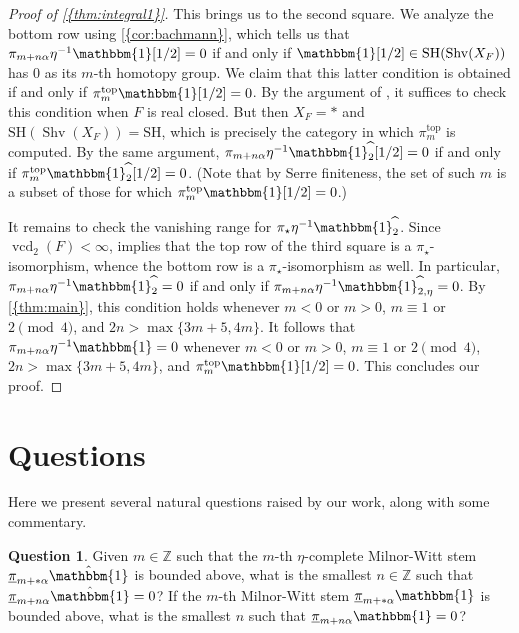 \documentclass[10pt]{amsart}
\numberwithin{equation}{section}
\theoremstyle{plain}
\theoremstyle{definition}
\newtheorem{question}[question]{Question}
\theoremstyle{remark}
\begin{document}
\begin{proof}[Proof of {\autoref{{thm:integral1}}}]
This brings us to the second square.  We analyze the bottom row using {\autoref{{cor:bachmann}}}, which tells us that $\pi_{m+n\alpha}\eta^{-1}{\mathbbm{1}}[1/2] = 0$ if and only if ${\mathbbm{1}}[1/2]\in {\mathrm{SH}}({\operatorname{Shv}}(X_F))$ has $0$ as its $m$-th homotopy group.  We claim that this latter condition is obtained if and only if $\pi_m^{{\mathrm{top}}}{\mathbbm{1}}[1/2] = 0$.  By the argument of \cite[Proposition 40]{bachmann:rho}, it suffices to check this condition when $F$ is real closed.  But then $X_F = *$ and ${\mathrm{SH}}({\operatorname{Shv}}(X_F)) = {\mathrm{SH}}$, which is precisely the category in which $\pi_m^{{\mathrm{top}}}$ is computed.  By the same argument, $\pi_{m+n\alpha}\eta^{-1}{\mathbbm{1}}{^{\widehat{~}}_{{2}}}[1/2] = 0$ if and only if $\pi_m^{{\mathrm{top}}}{\mathbbm{1}}{^{\widehat{~}}_{{2}}}[1/2] = 0$.  (Note that by Serre finiteness, the set of such $m$ is a subset of those for which $\pi_m^{{\mathrm{top}}}{\mathbbm{1}}[1/2] = 0$.)

It remains to check the vanishing range for $\pi_\star \eta^{-1}{\mathbbm{1}}{^{\widehat{~}}_{{2}}}$.  Since ${\operatorname{vcd}}_2(F)<\infty$, \cite[Theorem 1]{MASSConv} implies that the top row of the third square is a $\pi_\star$-isomorphism, whence the bottom row is a $\pi_\star$-isomorphism as well.  In particular, $\pi_{m+n\alpha}\eta^{-1}{\mathbbm{1}}{^{\widehat{~}}_{{2}}} = 0$ if and only if $\pi_{m+n\alpha}\eta^{-1}{\mathbbm{1}}{^{\widehat{~}}_{{2,\eta}}} = 0$.  By {\autoref{{thm:main}}}, this condition holds whenever $m<0$ or $m>0$, $m\equiv1$ or $2\pmod 4$, and $2n>\max\{3m+5,4m\}$.  It follows that $\pi_{m+n\alpha}\eta^{-1}{\mathbbm{1}} = 0$ whenever $m<0$ or $m>0$, $m\equiv1$ or $2\pmod 4$,  $2n>\max\{3m+5,4m\}$, and $\pi_m^{{\mathrm{top}}} {\mathbbm{1}}[1/2] =0$.  This concludes our proof.
\end{proof}

\section{Questions}\label{sec:q}
Here we present several natural questions raised by our work, along with some commentary.

\begin{question}
Given $m\in {\mathbb{Z}}$ such that the $m$-th $\eta$-complete Milnor-Witt stem ${\underline{\smash{\pi}}}_{m+*\alpha}\hat{\mathbbm{1}}$ is bounded above, what is the smallest $n\in {\mathbb{Z}}$ such that ${\underline{\smash{\pi}}}_{m+n\alpha}\hat{\mathbbm{1}} =0$?  If the $m$-th Milnor-Witt stem ${\underline{\smash{\pi}}}_{m+*\alpha}{\mathbbm{1}}$ is bounded above, what is the smallest $n$ such that ${\underline{\smash{\pi}}}_{m+n\alpha}{\mathbbm{1}}=0$?
\end{question}
\end{document}
